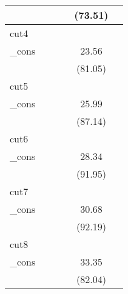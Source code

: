 {\begin{tabular}{l*{5}{c}}
            &                     &                     &                     &     (73.51)         &                     \\
\hline
cut4        &                     &                     &                     &                     &                     \\
\_cons      &                     &                     &                     &       23.56\sym{***}&                     \\
            &                     &                     &                     &     (81.05)         &                     \\
\hline
cut5        &                     &                     &                     &                     &                     \\
\_cons      &                     &                     &                     &       25.99\sym{***}&                     \\
            &                     &                     &                     &     (87.14)         &                     \\
\hline
cut6        &                     &                     &                     &                     &                     \\
\_cons      &                     &                     &                     &       28.34\sym{***}&                     \\
            &                     &                     &                     &     (91.95)         &                     \\
\hline
cut7        &                     &                     &                     &                     &                     \\
\_cons      &                     &                     &                     &       30.68\sym{***}&                     \\
            &                     &                     &                     &     (92.19)         &                     \\
\hline
cut8        &                     &                     &                     &                     &                     \\
\_cons      &                     &                     &                     &       33.35\sym{***}&                     \\
            &                     &                     &                     &     (82.04)         &                     \\

\end{tabular}}
